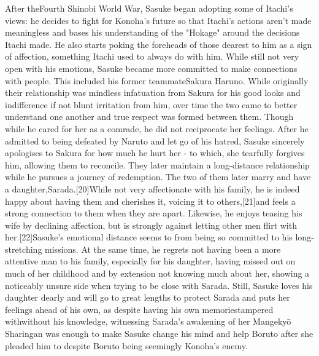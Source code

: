 \documentclass[a4paper,12pt]{article}
\begin{document}
After theFourth Shinobi World War, Sasuke began adopting some of Itachi's views: he decides to fight for Konoha's future so that Itachi's actions aren't made meaningless and bases his understanding of the "Hokage" around the decisions Itachi made. He also starts poking the foreheads of those dearest to him as a sign of affection, something Itachi used to always do with him. While still not very open with his emotions, Sasuke became more committed to make connections with people. This included his former teammateSakura Haruno. While originally their relationship was mindless infatuation from Sakura for his good looks and indifference if not blunt irritation from him, over time the two came to better understand one another and true respect was formed between them. Though while he cared for her as a comrade, he did not reciprocate her feelings. After he admitted to being defeated by Naruto and let go of his hatred, Sasuke sincerely apologises to Sakura for how much he hurt her - to which, she tearfully forgives him, allowing them to reconcile. They later maintain a long-distance relationship while he pursues a journey of redemption. The two of them later marry and have a daughter,Sarada.[20]While not very affectionate with his family, he is indeed happy about having them and cherishes it, voicing it to others,[21]and feels a strong connection to them when they are apart. Likewise, he enjoys teasing his wife by declining affection, but is strongly against letting other men flirt with her.[22]Sasuke's emotional distance seems to from being so committed to his long-stretching missions. At the same time, he regrets not having been a more attentive man to his family, especially for his daughter, having missed out on much of her childhood and by extension not knowing much about her, showing a noticeably unsure side when trying to be close with Sarada. Still, Sasuke loves his daughter dearly and will go to great lengths to protect Sarada and puts her feelings ahead of his own, as despite having his own memoriestampered withwithout his knowledge, witnessing Sarada's awakening of her Mangekyō Sharingan was enough to make Sasuke change his mind and help Boruto after she pleaded him to despite Boruto being seemingly Konoha's enemy.\\ \par \vspace{0.5cm}
\end{document}
